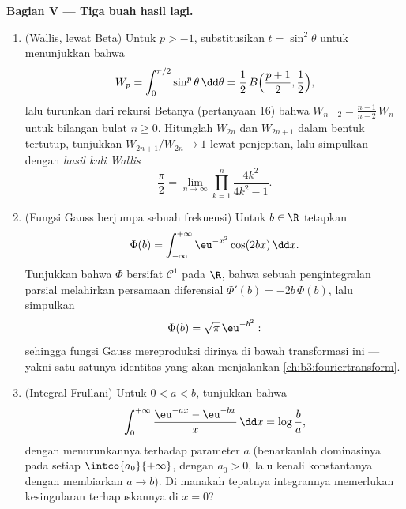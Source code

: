 \begin{problem}
\medskip
\noindent\textbf{Bagian V --- Tiga buah hasil lagi.}
\begin{enumerate}[resume]
  \item (Wallis, lewat Beta) Untuk $p > -1$, substitusikan $t =
        \sin^2\theta$ untuk menunjukkan bahwa
        \[
        W_p = \int_0^{\pi/2}\sin^p\theta\,\dd\theta
        = \frac12\,B\Bigl(\frac{p+1}2, \frac12\Bigr),
        \]
        lalu turunkan dari rekursi Betanya (pertanyaan 16) bahwa
        $W_{n+2} = \frac{n+1}{n+2}\,W_n$ untuk bilangan bulat $n \geq
        0$. Hitunglah $W_{2n}$ dan $W_{2n+1}$ dalam bentuk tertutup,
        tunjukkan $W_{2n+1}/W_{2n} \to 1$ lewat penjepitan, lalu simpulkan
        dengan \emph{hasil kali Wallis}
        \[
        \frac\pi2 = \lim_{n\to\infty}
        \prod_{k=1}^{n}\frac{4k^2}{4k^2 - 1} .
        \]
  \item (Fungsi Gauss berjumpa sebuah frekuensi) Untuk $b \in \R$ tetapkan
        \[
        \Phi(b) = \int_{-\infty}^{+\infty}
        \eu^{-x^2}\cos(2bx)\,\dd x .
        \]
        Tunjukkan bahwa $\Phi$ bersifat $\mathcal C^1$ pada $\R$, bahwa sebuah
        pengintegralan parsial melahirkan persamaan diferensial
        $\Phi'(b) = -2b\,\Phi(b)$, lalu simpulkan
        \[
        \Phi(b) = \sqrt\pi\,\eu^{-b^2} :
        \]
        sehingga fungsi Gauss mereproduksi dirinya di bawah transformasi ini ---
        yakni satu-satunya identitas yang akan menjalankan
        \cref{ch:b3:fouriertransform}.
  \item (Integral Frullani) Untuk $0 < a < b$, tunjukkan bahwa
        \[
        \int_0^{+\infty}
        \frac{\eu^{-ax} - \eu^{-bx}}{x}\,\dd x
        = \log\frac ba ,
        \]
        dengan menurunkannya terhadap parameter $a$ (benarkanlah
        dominasinya pada setiap $\intco{a_0}{+\infty}$, dengan $a_0 > 0$,
        lalu kenali konstantanya dengan membiarkan $a \to b$).
        Di manakah tepatnya integrannya memerlukan
        kesingularan terhapuskannya di $x = 0$?

\end{enumerate}
\end{problem}
